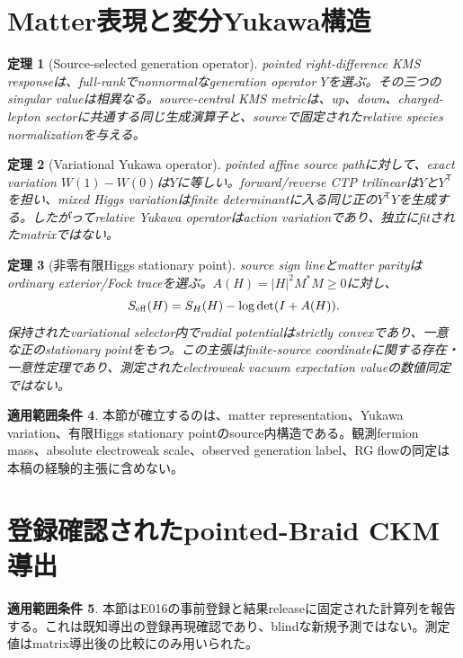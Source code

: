 \documentclass[11pt]{article}
\newtheorem{theorem}{定理}[section]
\theoremstyle{definition}
\newtheorem{scope}[theorem]{適用範囲条件}
\theoremstyle{remark}
\begin{document}
\section{Matter表現と変分Yukawa構造}

\begin{theorem}[Source-selected generation operator]
pointed right-difference KMS responseは、full-rankでnonnormalなgeneration operator $Y$を選ぶ。その三つのsingular valueは相異なる。source-central KMS metricは、up、down、charged-lepton sectorに共通する同じ生成演算子と、sourceで固定されたrelative species normalizationを与える。
\end{theorem}

\begin{theorem}[Variational Yukawa operator]
pointed affine source pathに対して、exact variation $W(1)-W(0)$は$Y$に等しい。forward/reverse CTP trilinearは$Y$と$Y^{\mathsf T}$を担い、mixed Higgs variationはfinite determinantに入る同じ正の$Y^{\mathsf T}Y$を生成する。したがってrelative Yukawa operatorはaction variationであり、独立にfitされたmatrixではない。
\end{theorem}

\begin{theorem}[非零有限Higgs stationary point]
source sign lineとmatter parityはordinary exterior/Fock traceを選ぶ。$A(H)=|H|^2M^*M\ge0$に対し、
\begin{equation}
S_{\rm eff}(H)=S_H(H)-\log\det(I+A(H)).
\label{eq:higgsaction}
\end{equation}
保持されたvariational selector内でradial potentialはstrictly convexであり、一意な正のstationary pointをもつ。この主張はfinite-source coordinateに関する存在・一意性定理であり、測定されたelectroweak vacuum expectation valueの数値同定ではない。
\end{theorem}

\begin{scope}
本節が確立するのは、matter representation、Yukawa variation、有限Higgs stationary pointのsource内構造である。観測fermion mass、absolute electroweak scale、observed generation label、RG flowの同定は本稿の経験的主張に含めない。
\end{scope}

\section{登録確認されたpointed-Braid CKM導出}

\begin{scope}
本節はE016の事前登録と結果releaseに固定された計算列を報告する。これは既知導出の登録再現確認であり、blindな新規予測ではない。測定値はmatrix導出後の比較にのみ用いられた\cite{e016prereg,e016result,pdg2024ckm}。
\end{scope}
\end{document}
